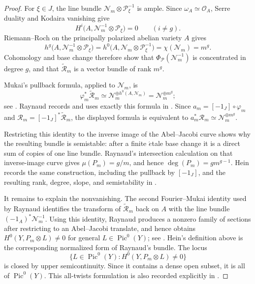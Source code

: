 \documentclass[a4paper]{amsart}
\theoremstyle{remark}
\DeclareMathOperator{\Pic}{Pic}
\newcommand{\OO}{\mathcal O}
\begin{document}
\begin{proof}
For \(\xi\in J\), the line bundle
\(\mathcal N_m\otimes\mathcal P_\xi^{-1}\) is ample.  Since
\(\omega_A\simeq\OO_A\), Serre duality and Kodaira vanishing give
\[
 H^i\bigl(A,\mathcal N_m^{-1}\otimes\mathcal P_\xi\bigr)=0
 \qquad(i\neq g).
\]
Riemann--Roch on the principally polarized abelian variety \(A\) gives
\[
 h^g\bigl(A,\mathcal N_m^{-1}\otimes\mathcal P_\xi\bigr)
 =h^0\bigl(A,\mathcal N_m\otimes\mathcal P_\xi^{-1}\bigr)
 =\chi(\mathcal N_m)=m^g.
\]
Cohomology and base change therefore show that
\(\Phi_{\mathcal P}(\mathcal N_m^{-1})\) is concentrated in degree \(g\), and that
\(\widetilde{\mathcal R}_m\) is a vector bundle of rank \(m^g\).

Mukai's pullback formula, applied to \(\mathcal N_m\), is
\[
 \varphi_m^*\widetilde{\mathcal R}_m
 \simeq \mathcal N_m^{\oplus h^0(A,\mathcal N_m)}
 =\mathcal N_m^{\oplus m^g};
\]
see \cite[Proposition 3.11(1)]{Mukai}.  Raynaud records and uses exactly this formula in \cite[\S3.1]{Raynaud}.  Since
\(a_m=[-1_J]\circ\varphi_m\) and
\(\mathcal R_m=[-1_J]^*\widetilde{\mathcal R}_m\), the displayed formula is equivalent to
\(a_m^*\mathcal R_m\simeq\mathcal N_m^{\oplus m^g}\).

Restricting this identity to the inverse image of the Abel--Jacobi curve shows why the resulting bundle is semistable: after a finite \(\acute{e}\)tale base change it is a direct sum of copies of one line bundle.  Raynaud's intersection calculation on that inverse-image curve gives
\(\mu(P_m)=g/m\), and hence
\(\deg(P_m)=g m^{g-1}\).  Hein records the same construction, including the pullback by \([-1_J]\), and the resulting rank, degree, slope, and semistability in \cite[\S2, Lemma 2.3]{Hein}.

It remains to explain the nonvanishing.  The second Fourier--Mukai identity used by Raynaud identifies the transform of
\(\widetilde{\mathcal R}_m\) back on \(A\) with the line bundle
\((-1_A)^*\mathcal N_m^{-1}\).  Using this identity, Raynaud produces a nonzero family of sections after restricting to an Abel--Jacobi translate, and hence obtains \(H^0(Y,P_m\otimes L)\neq 0\) for general \(L\in\Pic^0(Y)\); see \cite[\S3.1]{Raynaud}.  Hein's definition above is the corresponding normalized form of Raynaud's bundle.  The locus
\[
 \bigl\{L\in\Pic^0(Y):H^0(Y,P_m\otimes L)\neq 0\bigr\}
\]
is closed by upper semicontinuity.  Since it contains a dense open subset, it is all of \(\Pic^0(Y)\).  This all-twists formulation is also recorded explicitly in \cite[Introduction]{Hein}.
\end{proof}
\end{document}
